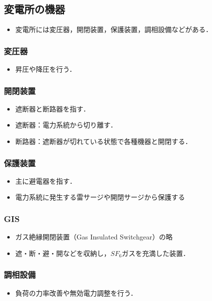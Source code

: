 \subsection{変電所の機器}
\begin{itemize}
  \item 変電所には変圧器，開閉装置，保護装置，調相設備などがある．
\end{itemize}

\subsubsection{変圧器}
\begin{itemize}
  \item 昇圧や降圧を行う．
\end{itemize}

\subsubsection{開閉装置}
\begin{itemize}
  \item 遮断器と断路器を指す．
  \item 遮断器：電力系統から切り離す．
  \item 断路器：遮断器が切れている状態で各種機器と開閉する．
\end{itemize}

\subsubsection{保護装置}
\begin{itemize}
  \item 主に避電器を指す．
  \item 電力系統に発生する雷サージや開閉サージから保護する
\end{itemize}

\subsubsection{GIS}
\begin{itemize}
  \item ガス絶縁開閉装置（Gas Insulated Switchgear）の略
  \item 遮・断・避・開などを収納し，$SF_6$ガスを充満した装置．
\end{itemize}

\subsubsection{調相設備}
\begin{itemize}
  \item 負荷の力率改善や無効電力調整を行う．
\end{itemize}

